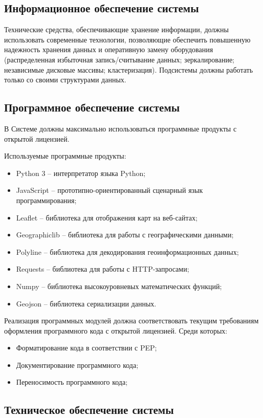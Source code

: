 \subsection{Информационное обеспечение системы}
Технические средства, обеспечивающие хранение информации, должны использовать современные 
технологии, позволяющие обеспечить повышенную надежность хранения данных и оперативную замену 
оборудования (распределенная избыточная запись/считывание данных; зеркалирование; независимые 
дисковые массивы; кластеризация). Подсистемы должны работать только со своими структурами данных.

\subsection{Программное обеспечение системы}
В Системе должны максимально использоваться программные продукты с открытой лицензией. 

Используемые программные продукты:
\begin{itemize}
    \item Python 3 -- интерпретатор языка Python;
    \item JavaScript -- прототипно-ориентированный сценарный язык программирования;
    \item Leaflet -- библиотека для отображения карт на веб-сайтах;
    \item Geographiclib -- библиотека для работы с географическими данными;
    \item Polyline -- библиотека для декодирования геоинформационных данных;
    \item Requests -- библиотека для работы с HTTP-запросами;
    \item Numpy -- библиотека высокоуровневых математических функций;
    \item Geojson -- библиотека сериализации данных.
\end{itemize}

Реализация программных модулей должна соответствовать текущим требованиям оформления программного кода 
с открытой лицензией. Среди которых:
\begin{itemize}
    \item Форматирование кода в соответствии с PEP;
    \item Документирование программного кода;
    \item Переносимость программного кода;
\end{itemize}

\subsection{Техническое обеспечение системы}

